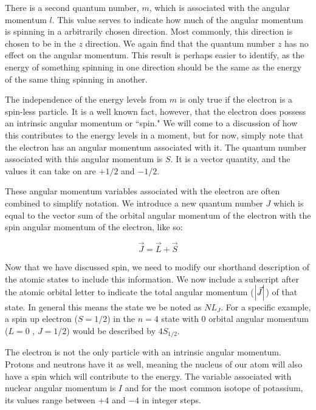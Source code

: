 \documentclass[letter,12pt]{article}
\begin{document}
		There is a second quantum number, $m$, which is associated 
		with the angular momentum $l$. This value serves to indicate
		how much of the angular momentum is spinning in a arbitrarily
		chosen direction. Most commonly, this direction is chosen
		to be in the $z$ direction. We again find that the quantum
        number $z$ has no effect on the angular momentum. This result
        is perhaps easier to identify, as the energy of something 
        spinning in one direction should be the same as the energy 
        of the same thing spinning in another. 

        The independence of the energy levels from $m$ is only true
        if the electron is a spin-less particle. It is a well known
        fact, however, that the electron does possess an intrinsic 
        angular momentum or ``spin." We will come to a discussion of 
        how this contributes to the energy levels in a moment, but 
        for now, simply note that the electron has an angular 
        momentum associated with it. The quantum number associated
        with this angular momentum is $S$. It is a vector 
		quantity, and the values it can take 
        on are $+1/2$ and $-1/2$.

        These angular momentum variables associated with the
        electron are often combined to simplify notation. We
        introduce a new quantum number $J$ which is equal to
        the vector sum of the orbital angular momentum of the
        electron with the spin angular momentum of the electron,
        like so: 

        \begin{equation}
            \vec{J} = \vec{L} + \vec{S}
        \end{equation}

        Now that we have discussed spin, we need to modify our 
        shorthand description of the atomic states to include
        this information. We now include a subscript after
        the atomic orbital letter to indicate the total angular
        momentum ($\abs{\vec{J}}$) of that state. In general
		this means the state we be noted as $NL_{J}$. For 
		a specific example, 
        a spin up electron ($S=1/2$) in the $n=4$ state with 
        0 orbital angular momentum ($L=0$ , $J=1/2$) would be 
        described by $4S_{1/2}$.

        The electron is not the only particle with an intrinsic
        angular momentum. Protons and neutrons have it as well,
        meaning the nucleus of our atom will also have a
        spin which will contribute to the energy. The variable
        associated with nuclear angular momentum is $I$ and
        for the most common isotope of potassium, its values
        range between $+4$ and $-4$ in integer steps. 
	
\end{document}
